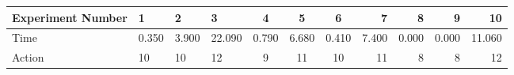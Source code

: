 \documentclass[8pt]{article}
\begin{document}
\begin{landscape}
\begin{tabular}{ | l | l | l | l | c | c | c | r | r | r | r | }
 \hline 
Experiment Number & 1 & 2 & 3 & 4 & 5 & 6 & 7 & 8 & 9 & 10\\ \hline
Time & 0.350 & 3.900 & 22.090 & 0.790 & 6.680 & 0.410 & 7.400 & 0.000 & 0.000 & 11.060\\ \hline
Action & 10 & 10 & 12 & 9 & 11 & 10 & 11 & 8 & 8 & 12\\ \hline\end{tabular}
\end{landscape}
\end{document}
